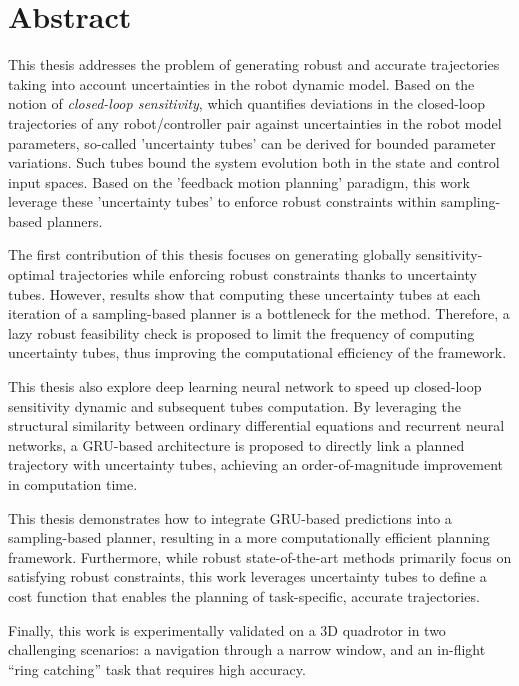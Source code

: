 \chapter*{Abstract}

This thesis addresses the problem of generating robust and accurate trajectories taking into account uncertainties in the robot dynamic model. 
Based on the notion of \emph{closed-loop sensitivity}, which quantifies deviations in the closed-loop trajectories of any robot/controller pair against uncertainties in the robot model parameters, so-called 'uncertainty tubes' can be derived for bounded parameter variations.
Such tubes bound the system evolution both in the state and control input spaces.
Based on the 'feedback motion planning' paradigm, this work leverage these 'uncertainty tubes' to enforce robust constraints within sampling-based planners.

The first contribution of this thesis focuses on generating globally sensitivity-optimal trajectories while enforcing robust constraints thanks to uncertainty tubes.
However, results show that computing these uncertainty tubes at each iteration of a sampling-based planner is a bottleneck for the method.
Therefore, a lazy robust feasibility check is proposed to limit the frequency of computing uncertainty tubes, thus improving the computational efficiency of the framework.

This thesis also explore deep learning neural network to speed up closed-loop sensitivity dynamic and subsequent tubes computation.
By leveraging the structural similarity between ordinary differential equations and recurrent neural networks, a GRU-based architecture is proposed to directly link a planned trajectory with uncertainty tubes, achieving an order-of-magnitude improvement in computation time.

This thesis demonstrates how to integrate GRU-based predictions into a sampling-based planner, resulting in a more computationally efficient planning framework. 
Furthermore, while robust state-of-the-art methods primarily focus on satisfying robust constraints, this work leverages uncertainty tubes to define a cost function that enables the planning of task-specific, accurate trajectories.

Finally, this work is experimentally validated on a 3D quadrotor in two challenging scenarios: a navigation through a narrow window, and an in-flight ``ring catching'' task that requires high accuracy. 